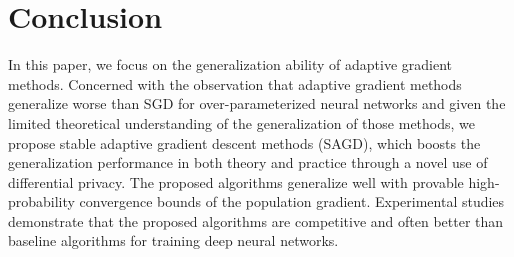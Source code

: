 \documentclass[11pt]{article}
\begin{document}

\begin{table}[H]
\small
\caption{ Test Perplexity of LSTMs on Penn Treebank. Bold number indicates the best result.}\label{tab:ppl}
\end{table}


\vspace{-0.05in}
\section{Conclusion}\label{sec: conclusion}
\vspace{-0.05in}

In this paper, we focus on the generalization ability of adaptive gradient methods. 
Concerned with the observation that adaptive gradient methods generalize worse than SGD for over-parameterized neural networks and given the limited theoretical understanding of the generalization of those methods,
we propose stable adaptive gradient descent methods (\textsc{SAGD}), which boosts the generalization performance in both theory and practice through a novel use of differential privacy. 
The proposed algorithms generalize well with provable high-probability convergence bounds of the population gradient. Experimental studies demonstrate that the proposed algorithms are competitive and often better than baseline algorithms for training deep neural networks. 



\clearpage




\clearpage


\appendix


\end{document}
